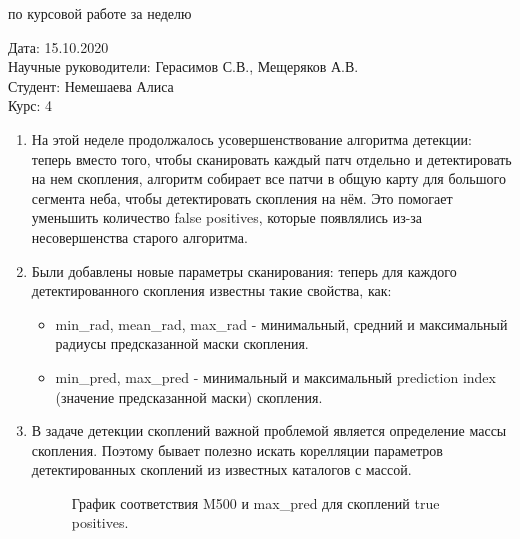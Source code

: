 \documentclass{article}
\begin{document}
\begin{center}{ по курсовой работе за неделю\\}\end{center}
Дата: 15.10.2020\\
Научные руководители: Герасимов С.В., Мещеряков А.В.\\
Студент: Немешаева Алиса\\
Курс: 4\\

\renewcommand{\labelitemi}{$\blacksquare$}
\renewcommand\labelitemii{$\square$}
\begin{enumerate}
    \item На этой неделе продолжалось усовершенствование алгоритма детекции: теперь вместо того, 
        чтобы сканировать каждый патч отдельно и детектировать на нем скопления, алгоритм 
        собирает все патчи в общую карту для большого сегмента неба, чтобы детектировать скопления 
        на нём. Это помогает уменьшить количество false positives, которые появлялись из-за 
        несовершенства старого алгоритма.\\
    \item Были добавлены новые параметры сканирования: теперь для каждого детектированного скопления 
        известны такие свойства, как:
        \begin{itemize}
            \item min\_rad, mean\_rad, max\_rad - минимальный, средний и максимальный радиусы 
                предсказанной маски скопления.\\
            \item min\_pred, max\_pred - минимальный и максимальный prediction index (значение 
                предсказанной маски) скопления.\\
        \end{itemize}
    \item В задаче детекции скоплений важной проблемой является определение массы скопления. 
        Поэтому бывает полезно искать корелляции параметров детектированных скоплений из известных 
        каталогов с массой.\\

    \begin{figure}[h]
        \caption{График соответствия M500 и max\_pred для скоплений true positives.}
    \end{figure}


\end{enumerate}
\end{document}
